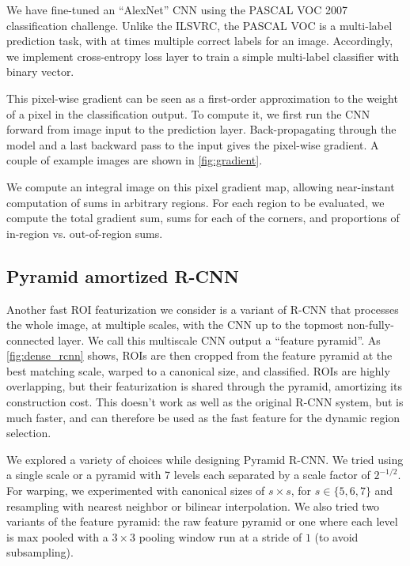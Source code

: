 We have fine-tuned an ``AlexNet'' \cite{Krizhevsky-NIPS-2012} CNN using the PASCAL VOC 2007 classification challenge.
Unlike the ILSVRC, the PASCAL VOC is a multi-label prediction task, with at times multiple correct labels for an image.
Accordingly, we implement cross-entropy loss layer to train a simple multi-label classifier with binary vector.

This pixel-wise gradient can be seen as a first-order approximation to the weight of a pixel in the classification output.
To compute it, we first run the CNN forward from image input to the prediction layer.
Back-propagating through the model and a last backward pass to the input gives the pixel-wise gradient.
A couple of example images are shown in \autoref{fig:gradient}.

We compute an integral image on this pixel gradient map, allowing near-instant computation of sums in arbitrary regions.
For each region to be evaluated, we compute the total gradient sum, sums for each of the corners, and proportions of in-region vs. out-of-region sums.


\subsection{Pyramid amortized R-CNN}\label{sec:dense}

Another fast ROI featurization we consider is a variant of R-CNN that processes the whole image, at multiple scales, with the CNN up to the topmost non-fully-connected layer.
We call this multiscale CNN output a ``feature pyramid''.
As \autoref{fig:dense_rcnn} shows, ROIs are then cropped from the feature pyramid at the best matching scale, warped to a canonical size, and classified.
ROIs are highly overlapping, but their featurization is shared through the pyramid, amortizing its construction cost.
This doesn't work as well as the original R-CNN system, but is much faster, and can therefore be used as the fast feature for the dynamic region selection.


We explored a variety of choices while designing Pyramid R-CNN.
We tried using a single scale or a pyramid with 7 levels each separated by a scale factor of $2^{-1/2}$.
For warping, we experimented with canonical sizes of $s \times s$, for $s \in \{5,6,7\}$ and resampling with nearest neighbor or bilinear interpolation.
We also tried two variants of the feature pyramid: the raw feature pyramid or one where each level is max pooled with a $3 \times 3$ pooling window run at a stride of $1$ (to avoid subsampling).

